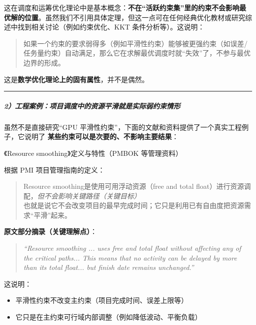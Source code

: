 \documentclass[
]{article}
\begin{document}
这在调度和运筹优化理论中是基本概念：\textbf{不在``活跃约束集''里的约束不会影响最优解的位置}。虽然我们不引用具体定理，但这一点可在任何经典优化教材或研究综述中找到相关讨论（例如约束优化、KKT
条件分析等）。这说明：

\begin{quote}
如果一个约束的要求弱得多（例如平滑性约束）能够被更强约束（如误差/任务量约束）自动满足，那么它在求解最优调度时就``失效''了，不参与最优边界的形成。
\end{quote}

这是\textbf{数学优化理论上的固有属性}，并不是偶然。

\begin{center}\rule{0.5\linewidth}{0.5pt}\end{center}

\subparagraph{2）工程案例：项目调度中的资源平滑就是实际弱约束情形}\label{2uxff09ux5de5ux7a0bux6848ux4f8bux9879ux76eeux8c03ux5ea6ux4e2dux7684ux8d44ux6e90ux5e73ux6ed1ux5c31ux662fux5b9eux9645ux5f31ux7ea6ux675fux60c5ux5f62}

虽然不是直接研究``GPU
平滑性约束''，下面的文献和资料提供了一个真实工程例子，它说明了
\textbf{某些约束可以是次要的、不影响主要结果}：

《Resource smoothing》定义与特性（PMBOK 等管理资料）

根据 PMI 项目管理指南的定义：

\begin{quote}
Resource smoothing是使用可用浮动资源（free and total
float）进行资源调配，\emph{但不会影响关键路径（关键目标）}\\
也就是说它不会改变项目的最早完成时间；它只是利用已有自由度把资源需求``平滑''起来。
\end{quote}

\textbf{原文部分摘录（关键理解点）}：

\begin{quote}
\emph{``Resource smoothing ... uses free and total float without
affecting any of the critical paths... This means that no activity can
be delayed by more than its total float... but finish date remains
unchanged.''}
\end{quote}

这说明：

\begin{itemize}
\item
  平滑性约束不改变主约束（项目完成时间、误差上限等）
\item
  它只是在主约束可行域内部调整（例如降低波动、平衡负载）
\end{itemize}
\end{document}
